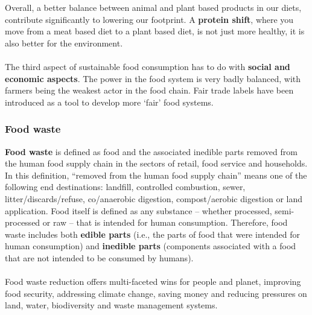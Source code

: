 \documentclass[../summary.tex]{subfiles}
\begin{document}
	Overall, a better balance between animal and plant based products in our diets, contribute significantly to lowering our footprint. A \textbf{protein shift}, where you move from a meat based diet to a plant based diet, is not just more healthy, it is also better for the environment. 
	\\\\
	The third aspect of sustainable food consumption has to do with \textbf{social and economic aspects}. The power in the food system is very badly balanced, with farmers being the weakest actor in the food chain. Fair trade labels have been introduced as a tool to develop more ‘fair’ food systems. 
	
	\subsubsection{Food waste}
	
	 \textbf{Food waste} is defined as food and the associated inedible parts removed from the human food supply chain in the sectors of retail, food service and households. In this definition, “removed from the human food supply chain” means one of the following end destinations: landfill, controlled combustion, sewer, litter/discards/refuse, co/anaerobic digestion, compost/aerobic digestion or land application. Food itself is defined as any substance – whether processed, semi-processed or raw – that is intended for human consumption. Therefore, food waste includes both \textbf{edible parts} (i.e., the parts of food that were intended for human consumption) and \textbf{inedible parts} (components associated with a food that are not intended to be consumed by humans). 
	 \\\\
	 Food waste reduction offers multi-faceted wins for people and planet, improving food security, addressing climate change, saving money and reducing pressures on land, water, biodiversity and waste management systems. 
	 
\end{document}
